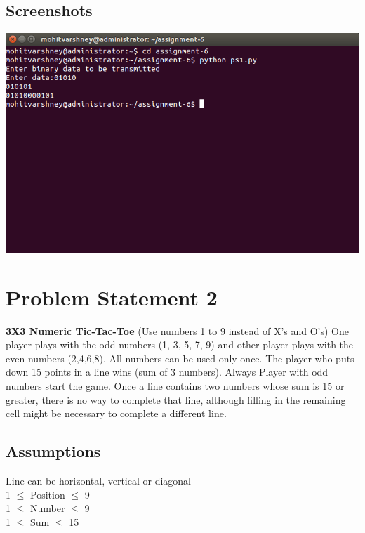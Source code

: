 \documentclass[12pt]{article}
\begin{document}
\subsection{Screenshots}
{
\begin{center}
    \vspace*{0.5 cm}
  \includegraphics[width=0.9\linewidth]{ps1.png}\\[1.0 cm]
\end{center}    
}



\pagebreak
\section{Problem Statement 2}
\textbf{3X3 Numeric Tic-Tac-Toe} (Use numbers 1 to 9 instead of X’s and O’s)
One player plays with the odd numbers (1, 3, 5, 7, 9) and other player plays with the even numbers (2,4,6,8). All numbers can be used only once. The player who puts down 15 points in a line wins (sum of 3 numbers). Always Player with odd numbers start the game. Once a line contains two numbers whose sum is 15 or greater, there is no way to complete that line, although filling in the remaining cell might be necessary to complete a different line.



\subsection{Assumptions}
{
Line can be horizontal, vertical or diagonal\\
1 $\leq$ Position $\leq$ 9\\
1 $\leq$ Number $\leq$ 9\\
1 $\leq$ Sum $\leq$ 15

}
\end{document}
